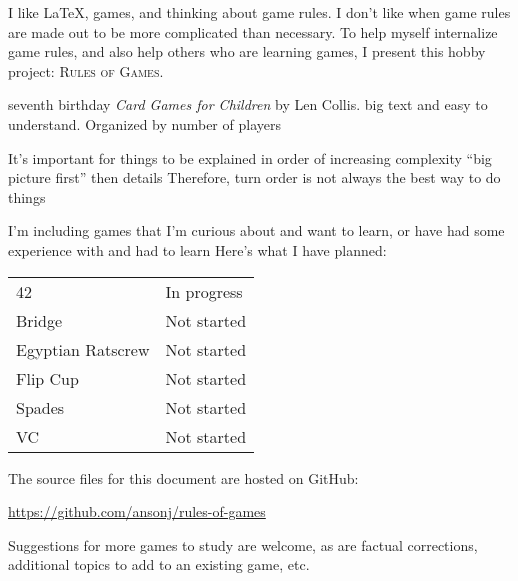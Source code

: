 
I like \LaTeX, games, and thinking about game rules. I don't like when game rules are made out to be more complicated than necessary. To help myself internalize game rules, and also help others who are learning games, I present this hobby project: \textsc{Rules of Games}.

seventh birthday
\emph{Card Games for Children} by Len Collis. big text and easy to understand. Organized by number of players

It's important for things to be explained in order of increasing complexity
``big picture first''
then details
Therefore, turn order is not always the best way to do things

I'm including games that I'm curious about and want to learn, or have had some experience with and had to learn
Here's what I have planned:

\begin{center}

\begin{tabular}{l|l}
    42 & In progress \\
    Bridge & Not started \\
    Egyptian Ratscrew & Not started \\
    Flip Cup & Not started \\
    Spades & Not started \\
    VC & Not started \\
\end{tabular}

\end{center}

The source files for this document are hosted on GitHub:

\begin{center}
    \url{https://github.com/ansonj/rules-of-games}
\end{center}

Suggestions for more games to study are welcome, as are factual corrections, additional topics to add to an existing game, etc.

